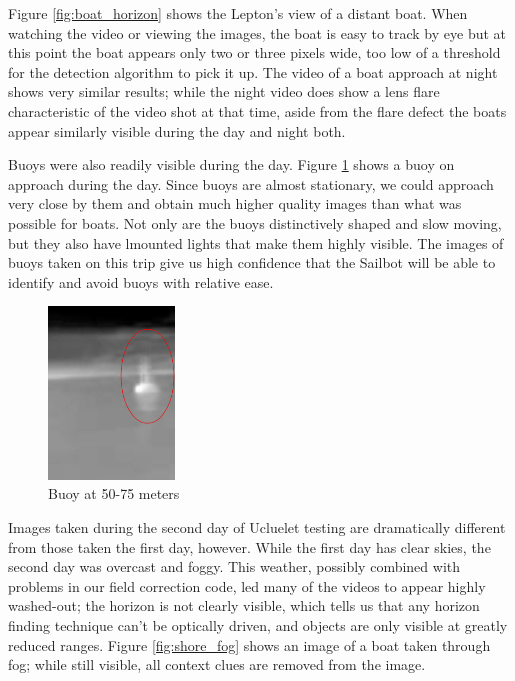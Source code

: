 Figure \ref{fig:boat_horizon} shows the Lepton's view of a distant boat. When watching the video or viewing the images, the boat is easy to track by eye but at this point the boat appears only two or three pixels wide, too low of a threshold for the detection algorithm to pick it up. The video of a boat approach at night shows very similar results; while the night video does show a lens flare characteristic of the video shot at that time, aside from the flare defect the boats appear similarly visible during the day and night both. 

Buoys were also readily visible during the day. Figure \ref{fig:buoy} shows a buoy on approach during the day. Since buoys are almost stationary, we could approach very close by them and obtain much higher quality images than what was possible for boats. Not only are the buoys distinctively shaped and slow moving, but they also have lmounted lights that make them highly visible. The images of buoys taken on this trip give us high confidence that the Sailbot will be able to identify and avoid buoys with relative ease.

\begin{figure}
\centering
\includegraphics[width=0.3\textwidth]{"./image/buoy_circled"}
\caption{Buoy at 50-75 meters}
\label{fig:buoy}
\end{figure}

Images taken during the second day of Ucluelet testing are dramatically different from those taken the first day, however. While the first day has clear skies, the second day was overcast and foggy. This weather, possibly combined with problems in our field correction code, led many of the videos to appear highly washed-out; the horizon is not clearly visible, which tells us that any horizon finding technique can't be optically driven, and objects are only visible at greatly reduced ranges. Figure \ref{fig:shore_fog} shows an image of a boat taken through fog; while still visible, all context clues are removed from the image.

